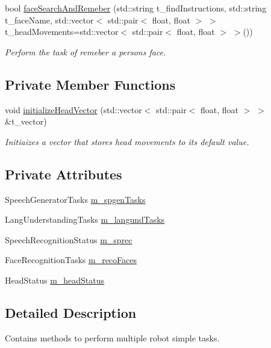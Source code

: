 \begin{DoxyCompactItemize}
bool \hyperlink{class_simple_tasks_aa62cea5d4153b44aa0f49cee954d8dc6}{face\+Search\+And\+Remeber} (std\+::string t\+\_\+find\+Instructions, std\+::string t\+\_\+face\+Name, std\+::vector$<$ std\+::pair$<$ float, float $>$ $>$ t\+\_\+head\+Movements=std\+::vector$<$ std\+::pair$<$ float, float $>$ $>$())
\begin{DoxyCompactList}\small\item\em Perform the task of remeber a person\textquotesingle{}s face. \end{DoxyCompactList}\end{DoxyCompactItemize}
\subsection*{Private Member Functions}
\begin{DoxyCompactItemize}
\item 
void \hyperlink{class_simple_tasks_a5997fdb1cc4d696149b5dd2462f253d7}{initialize\+Head\+Vector} (std\+::vector$<$ std\+::pair$<$ float, float $>$ $>$ \&t\+\_\+vector)
\begin{DoxyCompactList}\small\item\em Initiaizes a vector that stores head movements to its default value. \end{DoxyCompactList}\end{DoxyCompactItemize}
\subsection*{Private Attributes}
\begin{DoxyCompactItemize}
\item 
Speech\+Generator\+Tasks \hyperlink{class_simple_tasks_a6f47514f5e71977a2ff123311ad3dec2}{m\+\_\+spgen\+Tasks}
\item 
Lang\+Understanding\+Tasks \hyperlink{class_simple_tasks_a4cf498d52ac2f3f0cf8eff17688a876d}{m\+\_\+langund\+Tasks}
\item 
Speech\+Recognition\+Status \hyperlink{class_simple_tasks_a1459e7794f0b070486266456dbbc89c5}{m\+\_\+sprec}
\item 
Face\+Recognition\+Tasks \hyperlink{class_simple_tasks_a7fb0ede1319b6a8acc7b4e733e494f40}{m\+\_\+reco\+Faces}
\item 
Head\+Status \hyperlink{class_simple_tasks_ad01bd034086c0ff10994e0afae9a3398}{m\+\_\+head\+Status}
\end{DoxyCompactItemize}


\subsection{Detailed Description}
Contains methods to perform multiple robot simple tasks. 


